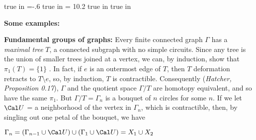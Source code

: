 
\overfullrule=0pt
\parindent=0pt

\nopagenumbers




 true in
\hoffset=-.6 true in
\hsize = 10.2 true in
 true in



\def\cltr{\Red}		  %

\loadmsbm



\def\ctln{\centerline}
\def\u{\underbar}
\def\ssk{\smallskip}
\def\msk{\medskip}
\def\bsk{\bigskip}
\def\hsk{\hskip.1in}
\def\hhsk{\hskip.2in}
\def\dsl{\displaystyle}
\def\hskp{\hskip1.5in}

\def\lra{$\Leftrightarrow$ }
\def\ra{\rightarrow}
\def\mpto{\logmapsto}
\def\pu{\pi_1}
\def\mpu{$\pi_1$}
\def\sig{\Sigma}
\def\msig{$\Sigma$}
\def\ep{\epsilon}
\def\sset{\subseteq}
\def\del{\partial}
\def\inv{^{-1}}
\def\wtl{\widetilde}
\def\del{\partial}
\def\delp{\partial^\prime}
\def\delpp{\partial^{\prime\prime}}
\def\sgn{{\roman{sgn}}}
\def\wtih{\widetilde{H}}
\def\bbz{{\Bbb Z}}
\def\bbr{{\Bbb R}}
\def\rtar{$\Rightarrow$}

\def\cltr{\Red}		  %
\def\cltb{\Blue}		  %
\def\cltg{\PineGreen}	  %


{\bf Some examples:}

\ssk

{\bf Fundamental groups of graphs:} Every finite connected graph $\Gamma$ has a {\it maximal tree} $T$,
a connected subgraph with no simple circuits. Since any tree is the 
union of smaller trees joined at a vertex, we can, by induction, show that 
$\pu(T) = \{ 1\}$ . In fact, if $e$ is an outermost edge of $T$, then 
$T$ deformation retracts to $T\setminus e$, so, by induction, $T$ is 
contractible. Consequently ({\it Hatcher, Proposition 0.17}), $\Gamma$ and the quotient space $\Gamma/T$
are homotopy equivalent, and so have the same \mpu . But $\Gamma/T=\Gamma_n$
is a bouquet of $n$ circles for some $n$. If we let ${\Cal U}$ = a neighborhood of 
the vertex in $\Gamma_n$, which is contractible, then, by singling out one petal of the bouquet,
we have

\ssk

\ctln{$\Gamma_n = (\Gamma_{n-1}\cup{\Cal U})\cup (\Gamma_1\cup{\Cal U}) = X_1\cup X_2$}


